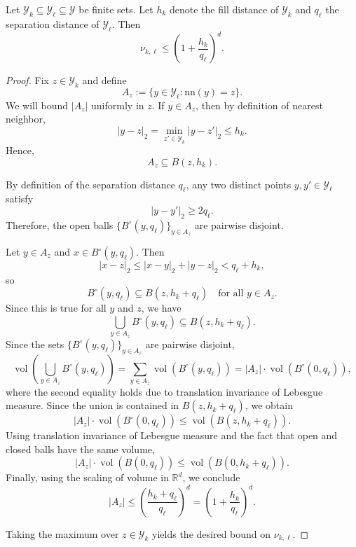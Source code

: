 \documentclass[10pt,a4paper]{amsart}
\newcommand{\Ycal}{\mathcal{Y}}
\begin{document}
\begin{lemma}
Let $\Ycal_k \subseteq \Ycal_\ell \subseteq \Ycal$ be finite sets. Let $h_k$ denote the fill distance of $\Ycal_k$ and $q_\ell$ the separation distance of $\Ycal_\ell$. Then
\[
\nu_{k,\ell}
\le
\left(1+\frac{h_k}{q_\ell}\right)^d.
\]
\end{lemma}

\begin{proof}
Fix $z \in \Ycal_k$ and define
\[
A_z := \{y \in \Ycal_\ell : \mathrm{nn}(y)=z\}.
\]
We will bound $|A_z|$ uniformly in $z$. If $y \in A_z$, then by definition of nearest neighbor,
\[
|y - z|_2 = \min_{z' \in \Ycal_k} |y - z'|_2 \le h_k.
\]
Hence,
\[
A_z \subseteq B(z,h_k).
\]

By definition of the separation distance $q_\ell$, any two distinct points $y,y' \in \Ycal_\ell$ satisfy
\[
|y - y'|_2 \ge 2q_\ell.
\]
Therefore, the open balls $\{B^\circ(y,q_\ell)\}_{y \in A_z}$ are pairwise disjoint.

Let $y \in A_z$ and $x \in B^\circ(y,q_\ell)$. Then
\[
|x - z|_2 \le |x - y|_2 + |y - z|_2 < q_\ell + h_k,
\]
so
\[
B^\circ(y,q_\ell) \subseteq B(z,h_k + q_\ell)
\quad \text{for all } y \in A_z.
\]
Since this is true for all $y$ and $z$, we have
\[
\bigcup_{y \in A_z} B^\circ(y,q_\ell) \subseteq B(z,h_k + q_\ell).
\]
Since the sets $\{B^\circ(y,q_\ell)\}_{y \in A_z}$ are pairwise disjoint,
\[
\operatorname{vol}\!\left(\bigcup_{y \in A_z} B^\circ(y,q_\ell)\right)
=
\sum_{y \in A_z} \operatorname{vol}(B^\circ(y,q_\ell))
=
|A_z| \cdot \operatorname{vol}(B^\circ(0,q_\ell)),
\]
where the second equality holds due to translation invariance of Lebesgue measure.
Since the union is contained in $B(z,h_k + q_\ell)$, we obtain
\[
|A_z| \cdot \operatorname{vol}(B^\circ(0,q_\ell))
\le
\operatorname{vol}(B(z,h_k + q_\ell)).
\]
Using translation invariance of Lebesgue measure and the fact that open and closed balls have the same volume,
\[
|A_z| \cdot \operatorname{vol}(B(0,q_\ell))
\le
\operatorname{vol}(B(0,h_k + q_\ell)).
\]
Finally, using the scaling of volume in $\mathbb{R}^d$, we conclude
\[
|A_z|
\le
\left(\frac{h_k + q_\ell}{q_\ell}\right)^d
=
\left(1+\frac{h_k}{q_\ell}\right)^d.
\]

Taking the maximum over $z \in \Ycal_k$ yields the desired bound on $\nu_{k,\ell}$.
\end{proof}
\end{document}
